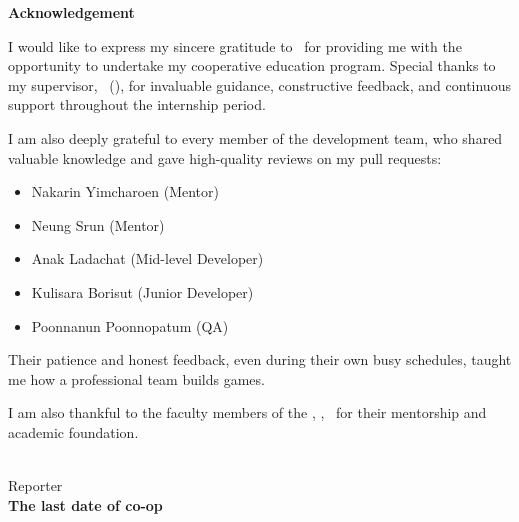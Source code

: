 \newpage
\renewcommand{\thepage}{(2)}

\begin{center}
  {\bfseries Acknowledgement \par}
\end{center}
\vspace{1em}

\noindent
I would like to express my sincere gratitude to \companyName\ for providing me with the opportunity to undertake my cooperative education program. Special thanks to my supervisor, \supervisorName\ (\supervisorPosition), for invaluable guidance, constructive feedback, and continuous support throughout the internship period.

I am also deeply grateful to every member of the development team, who shared valuable knowledge and gave high-quality reviews on my pull requests:

\begin{itemize}
  \setlength{\itemsep}{0pt}
  \setlength{\parskip}{0pt}
  \item Nakarin Yimcharoen (Mentor)
  \item Neung Srun (Mentor)
  \item Anak Ladachat (Mid-level Developer)
  \item Kulisara Borisut (Junior Developer)
  \item Poonnanun Poonnopatum (QA)
\end{itemize}

Their patience and honest feedback, even during their own busy schedules, taught me how a professional team builds games.

I am also thankful to the faculty members of the \departmentName, \facultyName, \universityName\ for their mentorship and academic foundation.

\vspace{1.5cm}

\begin{flushright}
  \begin{minipage}{0.5\textwidth}
    \centering
    \studentName \\[0.5em]
    Reporter \\[1.5em]
    \textbf{The last date of co-op} \\[0.3em]
    \coopEndDate
  \end{minipage}
\end{flushright}

\clearpage